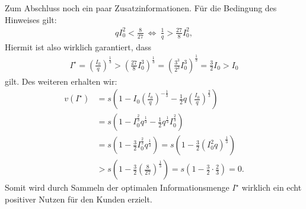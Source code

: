 Zum Abschluss noch ein paar Zusatzinformationen. Für die Bedingung des Hinweises gilt:
\begin{align*}
	q I_0^2 < \frac{8}{27}
	\ \Leftrightarrow \
	\frac{1}{q} > \frac{27 }{8} I_0^2,
\end{align*}
Hiermit ist also wirklich garantiert, dass
\begin{align*}
	I^\star 
	= 
	\left(\frac{I_0}{q}\right)^\frac{1}{3}
	>
	\left(\frac{27}{8} I_0^3\right)^\frac{1}{3}
	=
	\left(\frac{3^3}{2^3} I_0^3\right)^\frac{1}{3}
	= \frac{3}{2} I_0 > I_0
\end{align*}
gilt. Des weiteren erhalten wir:
\begin{align*}
	v(I^\star )
	&=
	s 
	\left(
		1 
		- 
		I_0 \left(\frac{I_0}{q}\right)^{-\frac{1}{3}}
		-
		\frac{1}{2} q \left(\frac{I_0}{q}\right)^{\frac{2}{3}}
	\right)\\
	&=
	s 
	\left(
	1 
	- 
	I_0^{\frac{2}{3}} q^{\frac{1}{3}}
	-
	\frac{1}{2} q^{\frac{1}{3}} I_0^\frac{2}{3}
	\right)\\
	&=
	s 
	\left(
	1 
	- 
	\frac{3}{2}
	I_0^{\frac{2}{3}} q^{\frac{1}{3}}
	\right)
	=
	s 
	\left(
	1 
	- 
	\frac{3}{2}
	\left(I_0^{2} q\right)^{\frac{1}{3}}
	\right)	\\
	&> 
	s 
	\left(
	1 
	- 
	\frac{3}{2} \left(\frac{8}{27}\right)^\frac{1}{3}
	\right)
	=
	s 
	\left(
	1 
	- 
	\frac{3}{2} \cdot \frac{2}{3}
	\right)
	= 0.
\end{align*}
Somit wird durch Sammeln der optimalen Informationsmenge $I^\star$ wirklich ein echt positiver Nutzen für den Kunden erzielt.

